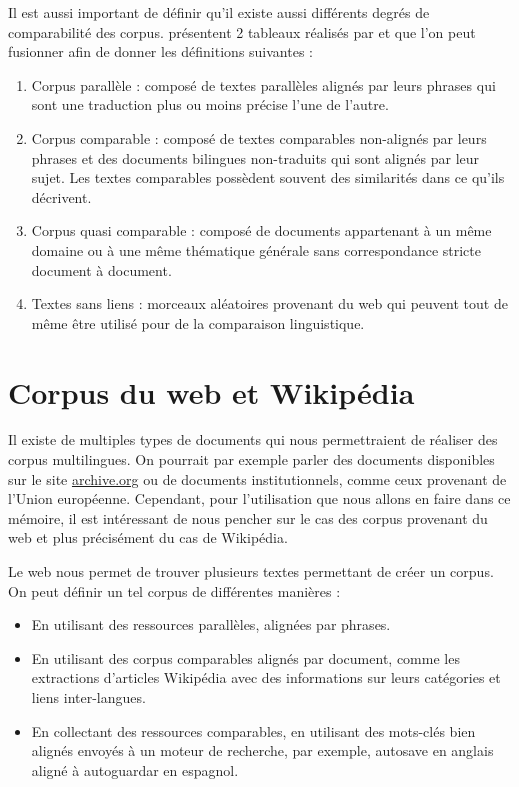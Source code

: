 Il est aussi important de définir qu'il existe aussi différents degrés de comparabilité des corpus.
\citet{sharoff_2016} présentent 2 tableaux réalisés par \citet{sharoff_2013a} et \citet{wu_2005} que
l'on peut fusionner afin de donner les définitions suivantes{ :}
\begin{enumerate}
\item Corpus parallèle{ :} composé de textes parallèles alignés par leurs \linebreak phrases qui sont une
traduction plus ou moins précise l'une de l'autre.
\item Corpus comparable{ :} composé de textes comparables non-alignés par leurs phrases et des
documents bilingues non-traduits qui sont alignés par leur sujet. Les textes comparables possèdent
souvent des similarités dans ce qu'ils décrivent.
\item Corpus quasi comparable{ :} composé de documents appartenant à un même
domaine ou à une même thématique générale sans correspondance stricte document à document.
\item Textes sans liens{ :} morceaux aléatoires provenant du web qui peu\-vent tout de même être
utilisé pour de la comparaison linguistique.
\end{enumerate}

\newpage

\section{Corpus du web et Wikipédia}

Il existe de multiples types de documents qui nous permettraient de réaliser des corpus multilingues.
On pourrait par exemple parler des documents disponibles sur le site \href{https://archive.org/}{archive.org}
ou de documents institutionnels, comme ceux provenant de l'Union européenne. Cependant, pour
l'utilisation que nous allons en faire dans ce mémoire, il est intéressant de nous pencher sur le cas des
corpus provenant du web et plus précisément du cas de Wikipédia.

Le web nous permet de trouver plusieurs textes permettant de créer un corpus.
On peut définir un tel corpus de différentes manières \citep{baroni_2004} \citep{sharoff_2013a}{ :}
\begin{itemize}
\item En utilisant des ressources parallèles, alignées par phrases.
\item En utilisant des corpus comparables alignés par document, comme les extractions d'articles Wikipédia
avec des informations sur leurs catégories et liens inter-langues.
\item En collectant des ressources comparables, en utilisant des mots-clés bien alignés envoyés à un moteur de
recherche, par exemple, autosave en anglais aligné à autoguardar en espagnol.
\end{itemize}

